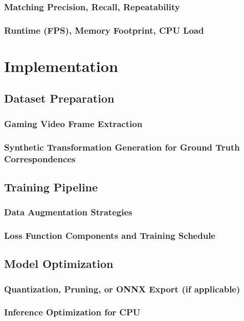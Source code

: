 \documentclass[a4paper,12pt]{report}
\begin{document}
\subsection{Matching Precision, Recall, Repeatability}
\subsection{Runtime (FPS), Memory Footprint, CPU Load}

\chapter{Implementation}
\section{Dataset Preparation}
\subsection{Gaming Video Frame Extraction}
\subsection{Synthetic Transformation Generation for Ground Truth Correspondences}

\section{Training Pipeline}
\subsection{Data Augmentation Strategies}
\subsection{Loss Function Components and Training Schedule}

\section{Model Optimization}
\subsection{Quantization, Pruning, or ONNX Export (if applicable)}
\subsection{Inference Optimization for CPU}
\end{document}
